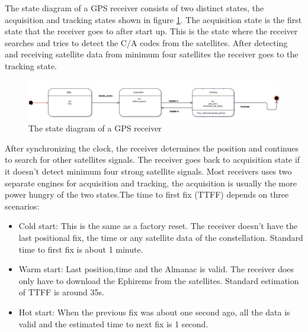   The state diagram of a GPS receiver consists of two distinct states, the acquisition and tracking states shown in figure \ref{fig:GPS reciever}. The acquisition state is the first state that the receiver goes to after start up. This is the state where the receiver searches and tries to detect the C/A codes from the satellites. After detecting and receiving satellite data from minimum four satellites the receiver goes to the tracking state.
 \begin{figure}[H]
\centering
\includegraphics[width=16 cm]{Project_Report/Images/gps_basics.PNG}
\caption{The state diagram of a GPS receiver}
\label{fig:GPS reciever}
\end{figure}

After synchronizing the clock, the receiver determines the position and continues to search for other satellites signals. The receiver goes back to acquisition state if it doesn't detect minimum four strong satellite signals.
Most receivers uses two separate engines for acquisition and tracking, the acquisition is usually the more power hungry of the two states.The time to first fix (TTFF) depends on three scenarios:
\begin{itemize}
\item Cold start: This is the same as a factory reset. The receiver doesn't have the last positional fix, the time or any satellite data of the constellation. Standard time to first fix  is about 1 minute.
\item Warm start: Last position,time and the Almanac is valid. The receiver does only have to download the Ephirems from the satellites. Standard estimation of TTFF is around 35s.
\item Hot start: When the previous fix was about one second ago, all the data is valid and the estimated time to next fix is 1 second. 

\end{itemize}




\newpage